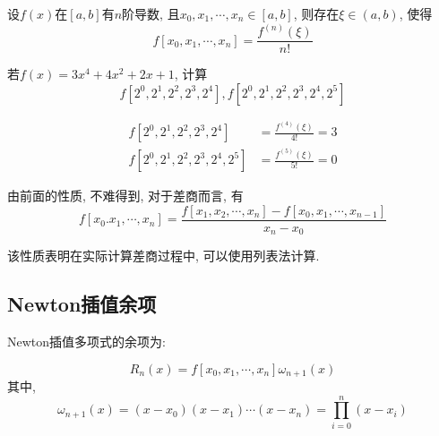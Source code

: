 设$f(x)$在$[a,b]$有$n$阶导数, 且$x_0,x_1,\cdots,x_n\in[a,b]$, 则存在$\xi\in(a,b)$, 使得
\begin{equation*}
    f[x_0,x_1,\cdots,x_n]=\frac{f^{(n)}(\xi)}{n!}
\end{equation*}

\begin{example}
    若$f(x)=3x^4+4x^2+2x+1$, 计算
    \begin{equation*}
        f[2^0,2^1,2^2,2^3,2^4], f[2^0,2^1,2^2,2^3,2^4,2^5]
    \end{equation*}
\end{example}

\begin{solution}
    \begin{align*}
        f[2^0,2^1,2^2,2^3,2^4]&=\frac{f^{(4)}(\xi)}{4!}=3\\
        f[2^0,2^1,2^2,2^3,2^4,2^5]&=\frac{f^{(5)}(\xi)}{5!}=0
    \end{align*}
\end{solution}

由前面的性质, 不难得到, 对于差商而言, 有
\begin{equation*}
    f[x_0.x_1,\cdots,x_n]=\frac{f[x_1,x_2,\cdots,x_n]-f[x_0,x_1,\cdots,x_{n-1}]}{x_n-x_0}
\end{equation*}

该性质表明在实际计算差商过程中, 可以使用列表法计算.

\subsection{Newton插值余项}

\begin{theorem}%
    Newton插值多项式的余项为:

    \begin{equation*}
        R_n(x)=f[x_0,x_1,\cdots,x_n]\omega_{n+1}(x)
    \end{equation*}
    其中,
    \begin{equation*}
        \omega_{n+1}(x)=(x-x_0)(x-x_1)\cdots(x-x_n)=\prod_{i=0}^n(x-x_i)
    \end{equation*}
\end{theorem}